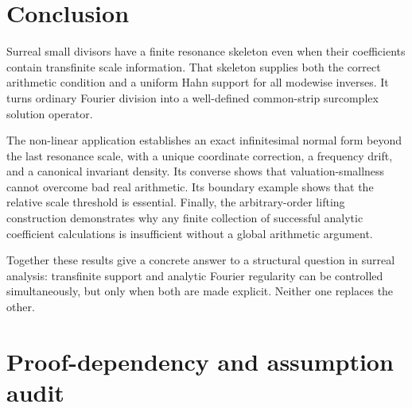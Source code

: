 \documentclass[11pt,letterpaper]{article}
\theoremstyle{definition}
\theoremstyle{remark}
\numberwithin{equation}{section}
\begin{document}
\section{Conclusion}

Surreal small divisors have a finite resonance skeleton even when their
coefficients contain transfinite scale information.  That skeleton supplies
both the correct arithmetic condition and a uniform Hahn support for all
modewise inverses.  It turns ordinary Fourier division into a well-defined
common-strip surcomplex solution operator.

The non-linear application establishes an exact infinitesimal normal form
beyond the last resonance scale, with a unique coordinate correction, a
frequency drift, and a canonical invariant density.  Its converse shows
that valuation-smallness cannot overcome bad real arithmetic.  Its boundary
example shows that the relative scale threshold is essential.  Finally,
the arbitrary-order lifting construction demonstrates why any finite
collection of successful analytic coefficient calculations is insufficient
without a global arithmetic argument.

Together these results give a concrete answer to a structural question in
surreal analysis: transfinite support and analytic Fourier regularity can be
controlled simultaneously, but only when both are made explicit.  Neither
one replaces the other.

\clearpage
\appendix
\section{Proof-dependency and assumption audit}
\label{app:audit}
\end{document}

